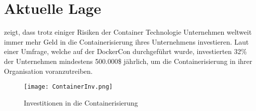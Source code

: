 \newpage
\section{Aktuelle Lage}
\label{sec:AktuelleLage}
 zeigt, dass trotz einiger Risiken der Container Technologie Unternehmen weltweit immer mehr Geld in die Containerisierung ihres Unternehmens investieren. Laut einer Umfrage, welche auf der DockerCon durchgeführt wurde, investierten 32\% der Unternehmen mindestens 500.000\$ jährlich, um die Containerisierung in ihrer Organisation voranzutreiben. \citep{Investments}
\begin{figure}[H]
	\begin{center}
		\texttt{[image: ContainerInv.png]}
	\end{center}
	\caption[Investitionen in die Containerisierung]{Investitionen in die Containerisierung}
	\label{fig:Stats1}
\end{figure}

